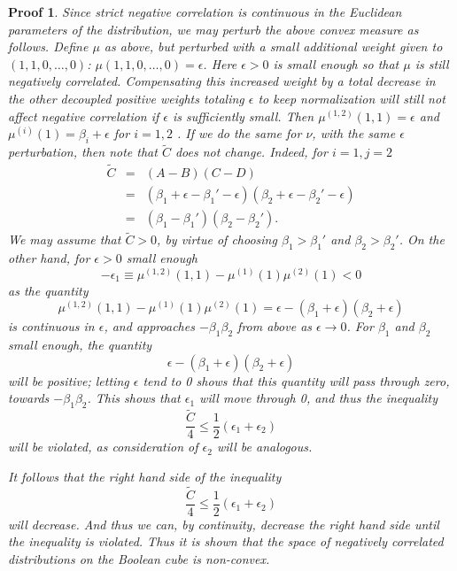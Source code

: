 \documentclass[10pt,a4paper]{amsart}
\newtheorem{Proof}{Proof}
\begin{document}
\begin{Proof}
Since strict negative correlation is continuous in the Euclidean parameters of the distribution, we may perturb the above convex measure as follows. Define $\mu$ as above, but perturbed with a small additional weight given to $(1,1,0,\dots, 0)$: $\mu(1,1,0,\dots, 0) = \epsilon$. Here $\epsilon>0$ is small enough so that $\mu$ is still negatively correlated.  
Compensating this increased weight by a total decrease in the other decoupled positive weights totaling $\epsilon$ to keep normalization will still not affect negative correlation if $\epsilon$ is sufficiently small.
Then $\mu^{(1,2)}(1,1) = \epsilon$ and $\mu^{(i)}(1) = \beta_i+\epsilon$ for $i=1,2$ . If we do the same for $\nu$, with the same $\epsilon$ perturbation, then note that $\tilde{C}$ does not change. Indeed, for $i=1, j=2$ 
\begin{eqnarray*}
    \tilde{C} &=& (A-B)(C-D) \\
    &=& (\beta_1+\epsilon-\beta_1'-\epsilon)(\beta_2+\epsilon -\beta_2'-\epsilon)\\
    &=&(\beta_1-\beta_1')(\beta_2-\beta_2').
    \end{eqnarray*}
We may assume that $\tilde{C}>0$, by virtue of choosing $\beta_1>\beta_1'$ and $\beta_2>\beta_2'$.
On the other hand, for $\epsilon>0$ small enough
\[
 -\epsilon_1 \equiv \mu^{(1,2)}(1,1) -\mu^{(1)}(1)\mu^{(2)}(1) <0
\]
as the quantity 
\[
\mu^{(1,2)}(1,1) -\mu^{(1)}(1)\mu^{(2)}(1) =\epsilon-(\beta_1+\epsilon)(\beta_2+\epsilon)
\]
is continuous in $\epsilon$, and approaches $-\beta_1\beta_2$ from above as $\epsilon\to 0$. For $\beta_1$ and $\beta_2$ small enough, the quantity 
\[
\epsilon-(\beta_1+\epsilon)(\beta_2+\epsilon)
\]
will be positive; letting $\epsilon$ tend to 0 shows that this quantity will pass through zero, towards $-\beta_1\beta_2$. This shows that $\epsilon_1$ will move through 0, and thus the inequality 
\[
\frac{\tilde{C}}{4} \leq \frac{1}{2}(\epsilon_1+\epsilon_2)
\]
will be violated, as consideration of $\epsilon_2$ will be analogous. 



It follows that the right hand side of the inequality 
\[
\frac{\tilde{C}}{4} \leq \frac{1}{2}(\epsilon_1+\epsilon_2)
\]
will decrease. And thus we can, by continuity, decrease the right hand side until the inequality is violated. Thus it is shown that the space of negatively correlated distributions on the Boolean cube is non-convex.
\end{Proof}
\end{document}
